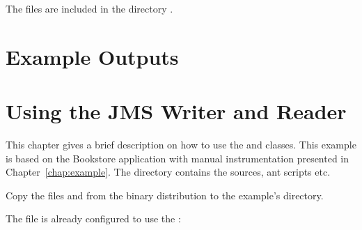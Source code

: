 The files are included in the directory \file{\aspectJBookstoreApplicationDirDistro{}/}.
      \setXMLListing
           
      

\chapter{Example \KiekerTraceAnalysis{} Outputs}


\chapter{Using the JMS Writer and Reader}\label{appendix:usingJMS}

This chapter gives a brief description on how to use the  and  %
classes. This example is based on the Bookstore %
application with manual instrumentation presented in Chapter~\ref{chap:example}. %
The directory \dir{\JMSBookstoreApplicationDirDistro/} contains the %
sources, ant scripts etc. 


\begin{compactenum}
\item Copy the files \file{\mainJar} and \file{\commonsLoggingJar} from the %
binary distribution to the example's  directory.
\item The file  %
is already configured to use the :
\end{compactenum}

\setPropertiesListing


